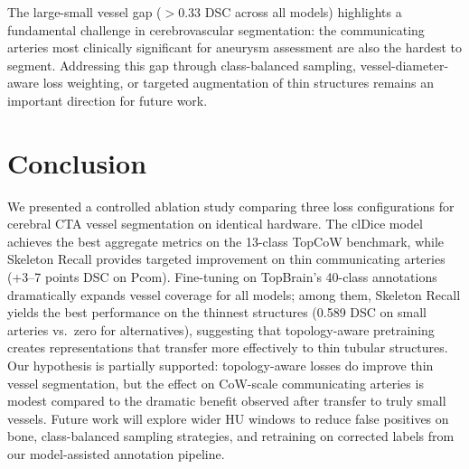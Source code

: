 \documentclass[conference]{IEEEtran}
\begin{document}
The large-small vessel gap ($>$0.33 DSC across all models) highlights a fundamental challenge in cerebrovascular segmentation: the communicating arteries most clinically significant for aneurysm assessment are also the hardest to segment. Addressing this gap through class-balanced sampling, vessel-diameter-aware loss weighting, or targeted augmentation of thin structures remains an important direction for future work.

\section{Conclusion}

We presented a controlled ablation study comparing three loss configurations for cerebral CTA vessel segmentation on identical hardware. The clDice model achieves the best aggregate metrics on the 13-class TopCoW benchmark, while Skeleton Recall provides targeted improvement on thin communicating arteries (+3--7 points DSC on Pcom). Fine-tuning on TopBrain's 40-class annotations dramatically expands vessel coverage for all models; among them, Skeleton Recall yields the best performance on the thinnest structures (0.589 DSC on small arteries vs.\ zero for alternatives), suggesting that topology-aware pretraining creates representations that transfer more effectively to thin tubular structures. Our hypothesis is partially supported: topology-aware losses do improve thin vessel segmentation, but the effect on CoW-scale communicating arteries is modest compared to the dramatic benefit observed after transfer to truly small vessels. Future work will explore wider HU windows to reduce false positives on bone, class-balanced sampling strategies, and retraining on corrected labels from our model-assisted annotation pipeline.


\end{document}
